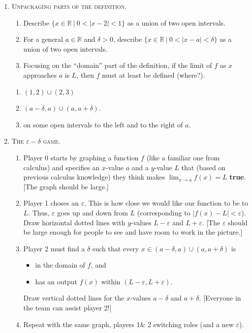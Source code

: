 \documentclass[12pt]{amsart}
\def\de{\delta}
\def\d{\delta}
\def\e{\varepsilon}
\newcommand{\R}{{\mathbb{R}}}
\numberwithin{equation}{section}
\theoremstyle{plain} %
\theoremstyle{definition}
\theoremstyle{remark}
\begin{document}
\begin{enumerate}
\item \textsc{Unpackaging parts of the definition.}
\begin{enumerate}
\item Describe $\{ x\in \R \ | \ 0< |x-2| < 1\}$ as a union of two open intervals.
\item For a general $a\in \R$ and $\delta>0$, describe $\{ x\in \R \ | \ 0< |x-a| <  \de\}$ as a union of two open intervals.
\item Focusing on the ``domain'' part of the definition, if the limit of $f$ as $x$ approaches $a$ is $L$, then $f$ must at least be defined \underline{\phantom{on some open}} (where?).
\end{enumerate}

\begin{framed}
\begin{enumerate}
\item $(1,2)\cup(2,3)$
\item $(a-\d,a)\cup(a,a+\d)$.
\item on some open intervals to the left and to the right of $a$.
\end{enumerate}
\end{framed}

\item \textsc{The $\e-\de$ game.}
\begin{enumerate}
\item Player 0 starts by graphing a function $f$ (like a familiar one from calculus) and specifies an $x$-value $a$ and a $y$-value $L$ that (based on previous calculus knowledge) they think makes $\lim_{x\to a} f(x) = L$ \textbf{true}. [The graph should be large.]
\item Player 1 choses an $\e$. This is how close we would like our function to be to $L$. Thus, $\e$ goes up and down from $L$ (corresponding to $|f(x)-L|<\e$). Draw horizontal dotted lines with $y$-values $L-\e$ and $L+\e$. [The $\e$ should be large enough for people to see and have room to work in the picture.]
\item Player 2 must find a $\de$ such that every $x \in (a-\de,a) \cup (a,a+\de)$ is 
\begin{itemize}
\item in the domain of $f$, and
\item has an output $f(x)$ within $(L-\e,L+\e)$.
\end{itemize}
Draw vertical dotted lines for the $x$-values $a-\de$ and $a+\de$. 
[Everyone in the team can assist player 2!]
\item Repeat with the same graph, players 1\& 2 switching roles (and a new $\e$).
\end{enumerate}



\end{enumerate}
\end{document}
